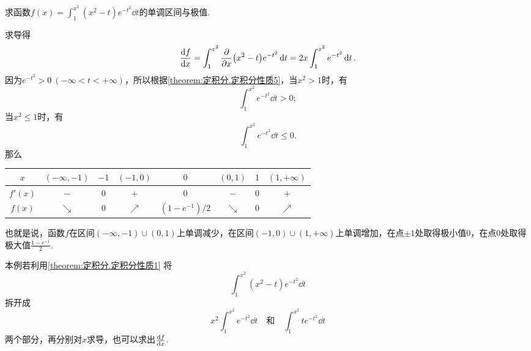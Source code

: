 \begin{example}
求函数\(f(x) = \int_1^{x^2} (x^2-t) e^{-t^2} \dd{t}\)的单调区间与极值.
\begin{solution}
求导得\[
\dv{f}{x}
= \int_1^{x^2} \pdv{x} (x^2-t) e^{-t^2} \dd{t}
= 2x \int_1^{x^2} e^{-t^2} \dd{t}.
\]
因为\(e^{-t^2}>0\ (-\infty<t<+\infty)\)，所以根据\cref{theorem:定积分.定积分性质5}，当\(x^2>1\)时，有\[
\int_1^{x^2} e^{-t^2} \dd{t} > 0;
\]当\(x^2 \leqslant 1\)时，有\[
\int_1^{x^2} e^{-t^2} \dd{t} \leqslant 0.
\]那么\begin{center}
\begin{tabular}{c|*7c}
\hline
\(x\) & \((-\infty,-1)\) & \(-1\) & \((-1,0)\) & \(0\) & \((0,1)\) & \(1\) & \((1,+\infty)\) \\ \hline
\(f'(x)\) & \(-\) & \(0\) & \(+\) & \(0\) & \(-\) & \(0\) & \(+\) \\
\(f(x)\) & \(\searrow\) & \(0\) & \(\nearrow\) & \((1-e^{-1})/2\) & \(\searrow\) & \(0\) & \(\nearrow\) \\
\hline
\end{tabular}
\end{center}
也就是说，函数\(f\)在区间\((-\infty,-1)\cup(0,1)\)上单调减少，在区间\((-1,0)\cup(1,+\infty)\)上单调增加，在点\(\pm1\)处取得极小值\(0\)，在点\(0\)处取得极大值\(\frac{1-e^{-1}}{2}\).
\end{solution}
\end{example}
本例若利用\cref{theorem:定积分.定积分性质1} 将\[
\int_1^{x^2} (x^2-t) e^{-t^2} \dd{t}
\]拆开成\[
x^2 \int_1^{x^2} e^{-t^2} \dd{t}
\quad\text{和}\quad
\int_1^{x^2} t e^{-t^2} \dd{t}
\]两个部分，再分别对\(x\)求导，也可以求出\(\dv{f}{x}\).

